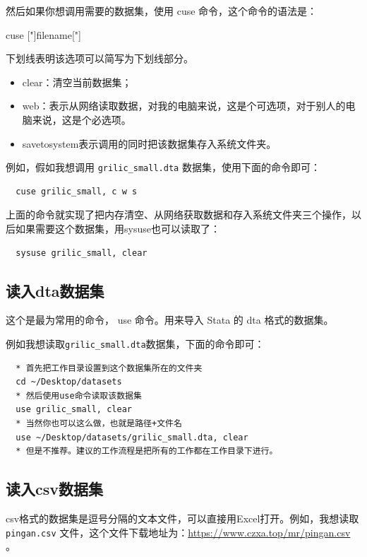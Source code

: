 \documentclass[cn,fancy,blue,11pt]{elegantbook}
\begin{document}
然后如果你想调用需要的数据集，使用 cuse 命令，这个命令的语法是：

\begin{stsyntax}
  \centering
  cuse
  ["]filename["]\
\end{stsyntax}

下划线表明该选项可以简写为下划线部分。

\begin{itemize}
  \item  clear：清空当前数据集；
  \item  web：表示从网络读取数据，对我的电脑来说，这是个可选项，对于别人的电脑来说，这是个必选项。
  \item  savetosystem表示调用的同时把该数据集存入系统文件夹。
\end{itemize}

例如，假如我想调用 \texttt{grilic\_small.dta} 数据集，使用下面的命令即可：

\begin{lstlisting}
  cuse grilic_small, c w s
\end{lstlisting}

上面的命令就实现了把内存清空、从网络获取数据和存入系统文件夹三个操作，以后如果需要这个数据集，用sysuse也可以读取了：

\begin{lstlisting}
  sysuse grilic_small, clear
\end{lstlisting}

\subsection{读入dta数据集}
这个是最为常用的命令， use 命令。用来导入 Stata 的 dta 格式的数据集。

例如我想读取\texttt{grilic\_small.dta}数据集，下面的命令即可：

\begin{lstlisting}
  * 首先把工作目录设置到这个数据集所在的文件夹
  cd ~/Desktop/datasets
  * 然后使用use命令读取该数据集
  use grilic_small, clear
  * 当然你也可以这么做，也就是路径+文件名
  use ~/Desktop/datasets/grilic_small.dta, clear
  * 但是不推荐。建议的工作流程是把所有的工作都在工作目录下进行。
\end{lstlisting}

\subsection{读入csv数据集}
csv格式的数据集是逗号分隔的文本文件，可以直接用Excel打开。例如，我想读取 \texttt{pingan.csv} 文件，这个文件下载地址为：\url{https://www.czxa.top/mr/pingan.csv} 。
\end{document}
